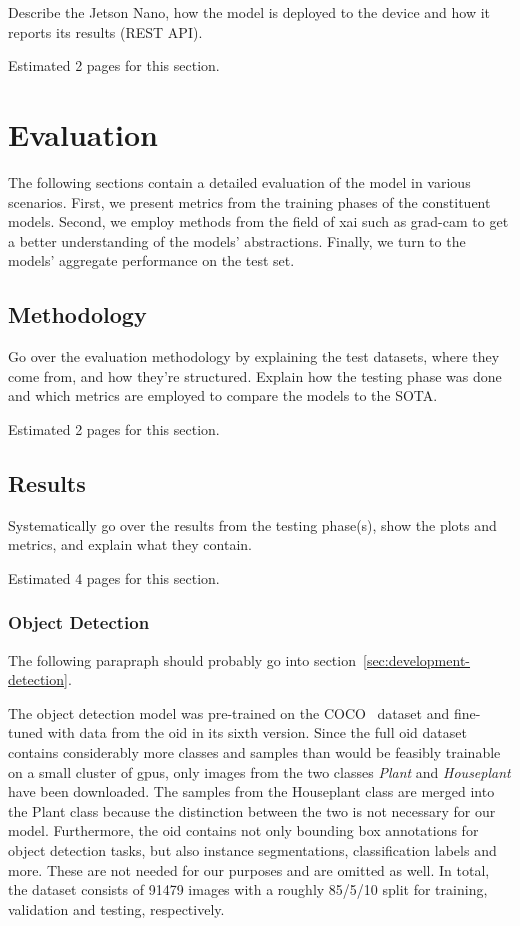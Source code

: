 \documentclass[draft,final]{vutinfth} %
\begin{document}
Describe the Jetson Nano, how the model is deployed to the device and
how it reports its results (REST API).

Estimated 2 pages for this section.

\chapter{Evaluation}
\label{chap:evaluation}

The following sections contain a detailed evaluation of the model in
various scenarios. First, we present metrics from the training phases
of the constituent models. Second, we employ methods from the field of
\gls{xai} such as \gls{grad-cam} to get a better understanding of the
models' abstractions. Finally, we turn to the models' aggregate
performance on the test set.

\section{Methodology}
\label{sec:methodology}

Go over the evaluation methodology by explaining the test datasets,
where they come from, and how they're structured. Explain how the
testing phase was done and which metrics are employed to compare the
models to the SOTA.

Estimated 2 pages for this section.

\section{Results}
\label{sec:results}

Systematically go over the results from the testing phase(s), show the
plots and metrics, and explain what they contain. 

Estimated 4 pages for this section.

\subsection{Object Detection}
\label{ssec:yolo-eval}

The following parapraph should probably go into
section~\ref{sec:development-detection}.

The object detection model was pre-trained on the COCO~\cite{lin2015}
dataset and fine-tuned with data from the \gls{oid}
\cite{kuznetsova2020} in its sixth version. Since the full \gls{oid}
dataset contains considerably more classes and samples than would be
feasibly trainable on a small cluster of \glspl{gpu}, only images from
the two classes \emph{Plant} and \emph{Houseplant} have been
downloaded. The samples from the Houseplant class are merged into the
Plant class because the distinction between the two is not necessary
for our model. Furthermore, the \gls{oid} contains not only bounding
box annotations for object detection tasks, but also instance
segmentations, classification labels and more. These are not needed
for our purposes and are omitted as well. In total, the dataset
consists of 91479 images with a roughly 85/5/10 split for training,
validation and testing, respectively.
\end{document}
